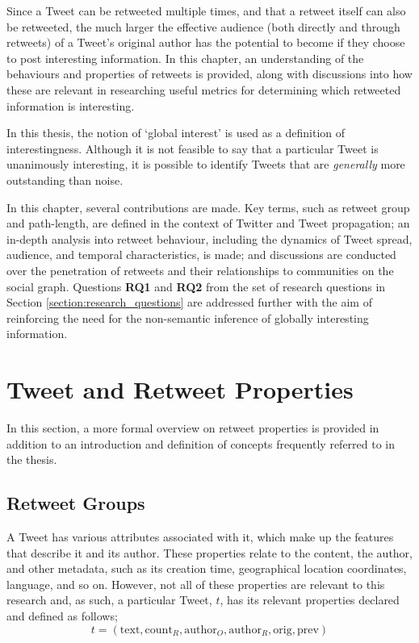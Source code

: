 Since a Tweet can be retweeted multiple times, and that a retweet itself can also be retweeted, the much larger the effective audience (both directly and through retweets) of a Tweet's original author has the potential to become if they choose to post interesting information. In this chapter, an understanding of the behaviours and properties of retweets is provided, along with discussions into how these are relevant in researching useful metrics for determining which retweeted information is interesting.

In this thesis, the notion of `global interest' is used as a definition of interestingness. Although it is not feasible to say that a particular Tweet is unanimously interesting, it is possible to identify Tweets that are \textit{generally} more outstanding than noise. 

In this chapter, several contributions are made. Key terms, such as retweet group and path-length, are defined in the context of Twitter and Tweet propagation; an in-depth analysis into retweet behaviour, including the dynamics of Tweet spread, audience, and temporal characteristics, is made; and discussions are conducted over the penetration of retweets and their relationships to communities on the social graph. Questions \textbf{RQ1} and \textbf{RQ2} from the set of research questions in Section \ref{section:research_questions} are addressed further with the aim of reinforcing the need for the non-semantic inference of globally interesting information.


\section{Tweet and Retweet Properties}
In this section, a more formal overview on retweet properties is provided in addition to an introduction and definition of concepts frequently referred to in the thesis.

\subsection{Retweet Groups}
A Tweet has various attributes associated with it, which make up the features that describe it and its author. These properties relate to the content, the author, and other metadata, such as its creation time, geographical location coordinates, language, and so on. However, not all of these properties are relevant to this research and, as such, a particular Tweet, $t$, has its relevant properties declared and defined as follows;
\[
	t = (\mathrm{text}, \mathrm{count}_R, \mathrm{author}_O, \mathrm{author}_R, \mathrm{orig}, \mathrm{prev})
\]

